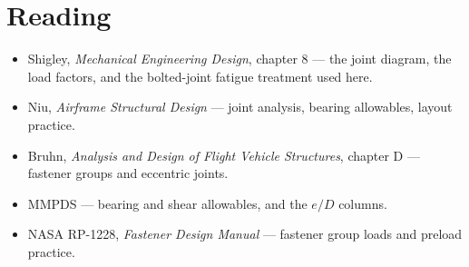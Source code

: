 \documentclass[11pt,a4paper]{article}
\begin{document}
\section*{Reading}

\begin{itemize}[leftmargin=*,nosep]
\item Shigley, \emph{Mechanical Engineering Design}, chapter 8 --- the joint diagram, the load
  factors, and the bolted-joint fatigue treatment used here.
\item Niu, \emph{Airframe Structural Design} --- joint analysis, bearing allowables, layout practice.
\item Bruhn, \emph{Analysis and Design of Flight Vehicle Structures}, chapter D --- fastener groups
  and eccentric joints.
\item MMPDS --- bearing and shear allowables, and the $e/D$ columns.
\item NASA RP-1228, \emph{Fastener Design Manual} --- fastener group loads and preload practice.
\end{itemize}
\end{document}
